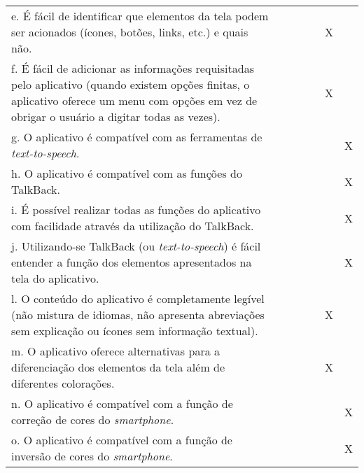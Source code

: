 \documentclass[portuguese,oneside]{tcc}
\begin{document}
\begin{center}
\begin{longtabu}{|L{25em}|c|c|c|c|c|c|}
e. É fácil de identificar que elementos da tela podem ser acionados (ícones, botões, links, etc.) e quais não. & & & & & X & \\ 
f. É fácil de adicionar as informações requisitadas pelo aplicativo (quando existem opções finitas, o aplicativo oferece um menu com opções em vez de obrigar o usuário a digitar todas as vezes). & & & & & X & \\ 
g. O aplicativo é compatível com as ferramentas de \emph{text-to-speech}. & & & & & & X \\ 
h. O aplicativo é compatível com as funções do TalkBack. & & & & & & X \\ 
i. É possível realizar todas as funções do aplicativo com facilidade através da utilização do TalkBack.	& & & & & & X \\ 
j. Utilizando-se TalkBack (ou \emph{text-to-speech}) é fácil entender a função dos elementos apresentados na tela do aplicativo. & & & & & & X \\ 
l. O conteúdo do aplicativo é completamente legível (não mistura de idiomas, não apresenta abreviações sem explicação ou ícones sem informação textual). & & & & & X & \\ 
m. O aplicativo oferece alternativas para a diferenciação dos elementos da tela além de diferentes colorações. & & & & & X & \\ 
n. O aplicativo é compatível com a função de correção de cores do \emph{smartphone}. & & & & & & X \\ 
o. O aplicativo é compatível com a função de inversão de cores do \emph{smartphone}. & & & & & & X \\ 
\end{longtabu}
\end{center}
\end{document}
